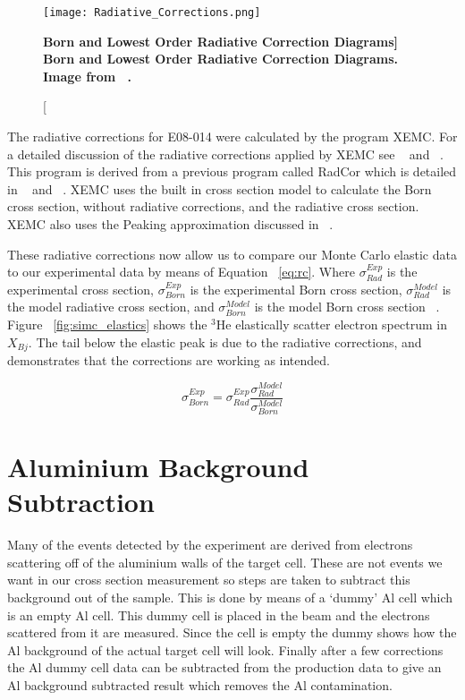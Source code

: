 \begin{figure}[!ht]
\begin{center}
\texttt{[image: Radiative\_Corrections.png]}
\end{center}
\caption[\bf{Born and Lowest Order Radiative Correction Diagrams}]{
{\bf{Born and Lowest Order Radiative Correction Diagrams.}} Image from ~\cite{Thesis:Wang}.}
\label{fig:rc}
\end{figure}

The radiative corrections for E08-014 were calculated by the program XEMC. For a detailed discussion of the radiative corrections applied by XEMC see ~\cite{Article:RC} and ~\cite{Article:RC2}. This program is derived from a previous program called RadCor which is detailed in ~\cite{Thesis:Yao} and ~\cite{Thesis:Slifer}. XEMC uses the built in cross section model to calculate the Born cross section, without radiative corrections, and the radiative cross section. XEMC also uses the Peaking approximation discussed in ~\cite{Article:RC2}. 

These radiative corrections now allow us to compare our Monte Carlo elastic data to our experimental data by means of Equation ~\ref{eq:rc}. Where $\sigma^{Exp}_{Rad}$ is the experimental cross section, $\sigma^{Exp}_{Born}$ is the experimental Born cross section, $\sigma^{Model}_{Rad}$ is the model radiative cross section, and $\sigma^{Model}_{Born}$ is the model Born cross section ~\cite{Thesis:Ye}. Figure ~\ref{fig:simc_elastics} shows the $^3$He elastically scatter electron spectrum in $X_{Bj}$. The tail below the elastic peak is due to the radiative corrections, and demonstrates that the corrections are working as intended.

\begin{equation} \label{eq:rc}
	\sigma^{Exp}_{Born} = \sigma^{Exp}_{Rad} \frac{\sigma^{Model}_{Rad}}{\sigma^{Model}_{Born}}
\end{equation}

\section{Aluminium Background Subtraction}
\label{sec:al}

Many of the events detected by the experiment are derived from electrons scattering off of the aluminium walls of the target cell. These are not events we want in our cross section measurement so steps are taken to subtract this background out of the sample. This is done by means of a `dummy' Al cell which is an empty Al cell. This dummy cell is placed in the beam and the electrons scattered from it are measured. Since the cell is empty the dummy shows how the Al background of the actual target cell will look. Finally after a few corrections the Al dummy cell data can be subtracted from the production data to give an Al background subtracted result which removes the Al contamination.


